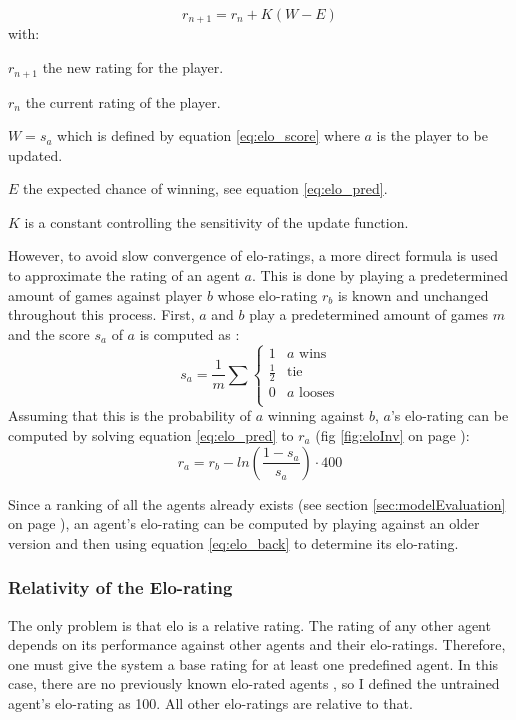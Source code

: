 \documentclass[12pt]{article}
\newcommand{\imgRef}[1]{(fig \ref{#1} on page \pageref{#1})}
\newcommand{\sectionref}[1]{section \ref{#1} on page \pageref{#1}}
\begin{document}
\begin{equation} \label{eq:elo_update}
r_{n+1} = r_n + K(W - E)
\end{equation}
with:
\begin{description}
\item \(r_{n+1}\) the new rating for the player.
\item \(r_{n}\) the current rating of the player.
\item \(W = s_a\) which is defined by equation \ref{eq:elo_score} where \(a\) is the player to be updated.
\item \(E\) the expected chance of winning, see equation \ref{eq:elo_pred}.
\item \(K\) is a constant controlling the sensitivity of the update function.
\end{description}
However, to avoid slow convergence of elo-ratings, a more direct formula is used to approximate the rating of an agent \(a\). This is done by playing a predetermined amount of games against player \(b\) whose elo-rating \(r_b\) is known and unchanged throughout this process. First, \(a\) and \(b\) play a predetermined amount of games \(m\) and the score \(s_a\) of \(a\) is computed as \cite{elo1978rating}:
\begin{equation} \label{eq:elo_score}
s_a = \frac{1}{m}\sum\left\{
\begin{array}{ll}
1 &              a\textrm{ wins} \\
\frac{1}{2} & \textrm{tie}\\
0 &              a\textrm{ looses}\\
\end{array}
\right.
\end{equation}
Assuming that this is the probability of \(a\) winning against \(b\), \(a\)'s elo-rating can be computed by solving equation \ref{eq:elo_pred} to \(r_a\) \imgRef{fig:eloInv}:
\begin{equation} \label{eq:elo_back}
r_a = r_b - ln\left(\frac{1-s_a}{s_a}\right) \cdot 400
\end{equation}
\begin{center}

\label{fig:eloInv}
\end{center}
Since a ranking of all the agents already exists (see \sectionref{sec:modelEvaluation}), an agent's elo-rating can be computed by playing against an older version and then using equation \ref{eq:elo_back} to determine its elo-rating. 
\subsubsection{Relativity of the Elo-rating}
The only problem is that elo is a relative rating. The rating of any other agent depends on its performance against other agents and their elo-ratings. Therefore, one must give the system a base rating for at least one predefined agent. In this case, there are no previously known elo-rated agents , so I defined the untrained agent's elo-rating as 100. All other elo-ratings are relative to that.
\end{document}
